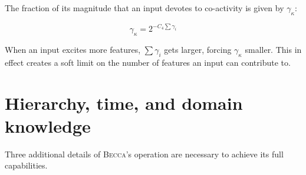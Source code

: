 The fraction of its magnitude that an input devotes to co-activity is given by $\gamma_\kappa$:

\begin{equation}
\gamma_\kappa = 2 ^ { - C_4\sum \gamma_i}
\end{equation}

When an input excites more features, $\sum \gamma_i$ gets larger, forcing $\gamma_\kappa$ smaller. This in effect creates a soft limit on the number of features an input can contribute to. 

\section{Hierarchy, time, and domain knowledge} 

Three additional details of \textsc{Becca}'s operation are necessary to achieve its full capabilities. 

